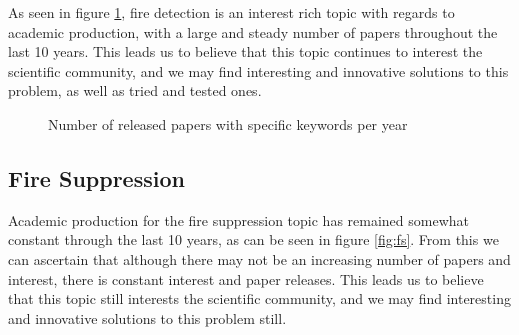 \documentclass[runningheads]{llncs}
\begin{document}
As seen in figure \ref{fig:fd}, fire detection is an interest rich topic with regards to academic production, with a large and steady number of papers throughout the last 10 years. This leads us to believe that this topic continues to interest the scientific community, and we may find interesting and innovative solutions to this problem, as well as tried and tested ones.

\begin{figure}[htb]
\caption{Number of released papers with specific keywords per year}
\label{fig:fd}
\end{figure}

\subsection{Fire Suppression}

Academic production for the fire suppression topic has remained somewhat constant through the last 10 years, as can be seen in figure \ref{fig:fs}. From this we can ascertain that although there may not be an increasing number of papers and interest, there is constant interest and paper releases. This leads us to believe that this topic still interests the scientific community, and we may find interesting and innovative solutions to this problem still. 
\end{document}
